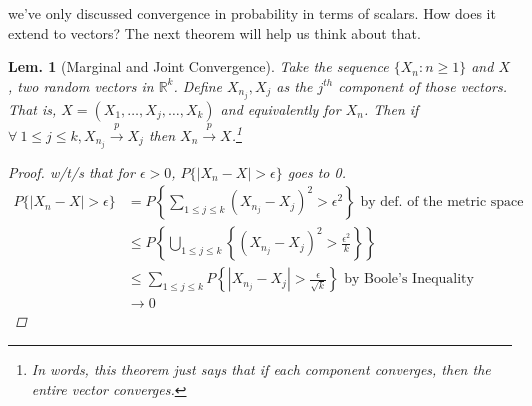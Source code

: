 \documentclass{tufte-book}
\theoremstyle{mytheoremstyle}
\theoremstyle{mylemstyle}
\newtheorem*{lem}{Lem.}
\theoremstyle{mydefstyle}
\begin{document}
 we've only discussed convergence in probability in terms of scalars. How does it extend to vectors? The next theorem will help us think about that.

\begin{lem}[Marginal and Joint Convergence] Take the sequence \(\{X_n: n \ge 1\}\) and \(X\), two random vectors in \(\mathbb{R}^k\). Define \(X_{n_j}, X_j\) as the \(j^{th}\) component of those vectors. That is, \(X = (X_1, \dots, X_j, \dots, X_k)\) and equivalently for \(X_n\). Then if \(\forall\ 1 \le j \le k, X_{n_j} \overset{p}{\rightarrow} X_j\) then \(X_n \overset{p}{\rightarrow} X\).\footnote{In words, this theorem just says that if each component converges, then the entire vector converges. }
	\begin{proof} w/t/s that for \(\epsilon > 0\), \(P\{|X_n - X| > \epsilon\}\) goes to 0.
	\begin{align*}
		P\{|X_n - X| > \epsilon\} & = P\left\{\sum_{1 \le j \le k} (X_{n_j} - X_j)^2 > \epsilon^2\right\} \text{ by def. of the metric space} \\
							& \le P\left\{\bigcup_{1 \le j \le k} \left\{(X_{n_j} - X_j)^2 > \frac{\epsilon^2}{k}\right\}\right\}\\
							& \le \sum_{1 \le j \le k} P\left\{|X_{n_j} - X_j| > \frac{\epsilon}{\sqrt{k}}\right\} \text{ by Boole's Inequality} \\
							& \rightarrow 0
	\end{align*}
	\end{proof}
\end{lem}
\end{document}

